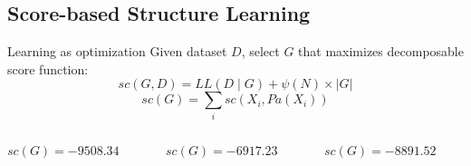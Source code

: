 \subsection{Score-based Structure Learning}
	\begin{frame}
		\begin{block}{Learning as optimization}
			Given dataset $D$, select $G$ that maximizes \alert{decomposable} score function:
				\[ {sc}( G , D ) = LL( D \mid G ) + \psi( N ) \times | G | \]
				\[ {sc}( G ) = \sum_i {sc}( X_i , {Pa}( X_i ) ) \]
		\end{block}
	\end{frame}
	
	\begin{frame}[fragile]
		\begin{columns}
			\begin{column}{.3\textwidth}
				\begin{figure}
					\centering
					
				\end{figure}
				\centering
				${sc}( G ) = -9508.34$
			\end{column}
			\begin{column}{.3\textwidth}
				\begin{figure}
					\centering
					
				\end{figure}
				\centering
				${sc}( G ) = -6917.23$
			\end{column}
			\begin{column}{.3\textwidth}
				\begin{figure}
					\centering
					
				\end{figure}
				\centering
				${sc}( G ) = -8891.52$
			\end{column}
		\end{columns}
	\end{frame}